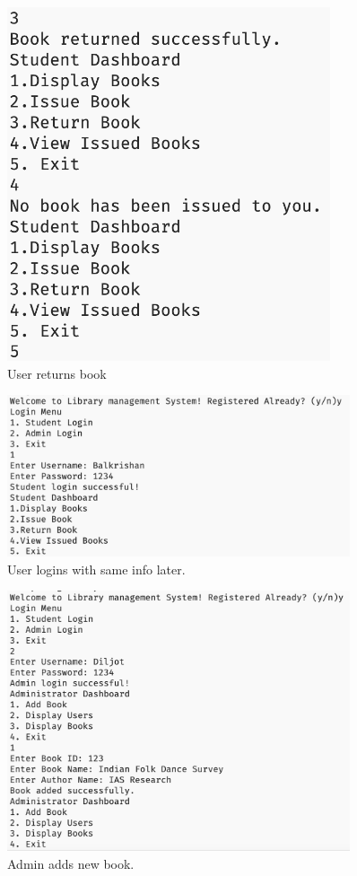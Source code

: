 \documentclass[12pt,a4paper]{report}
\begin{document}
\begin{figure}[h!]
    \centering
    \includegraphics[width=0.85\textwidth, height=0.65\textheight, keepaspectratio]{"./src/Screenshot_2024-11-24_at_16.15.38.png"}
    \caption{User returns book}
    \label{fig:fourth}
\end{figure}

\begin{figure}[h!]
    \centering
    \includegraphics[width=0.9\textwidth, height=0.7\textheight, keepaspectratio]{"./src/Screenshot_2024-11-24_at_16.16.05.png"}
    \caption{User logins with same info later.}
    \label{fig:fifth}
\end{figure}

\begin{figure}[h!]
    \centering
    \includegraphics[width=0.9\textwidth, height=0.7\textheight, keepaspectratio]{"./src/Screenshot_2024-11-24_at_16.28.08.png"}
    \caption{Admin adds new book.}
    \label{fig:sixth}
\end{figure}
\end{document}
